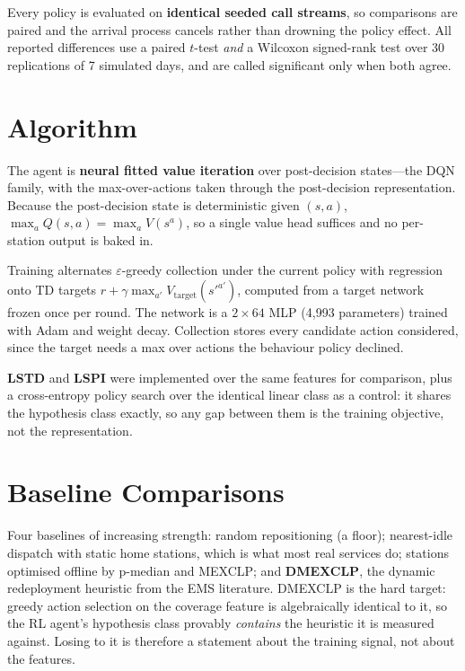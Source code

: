 \documentclass[10pt,twocolumn,a4paper]{article}
\begin{document}
Every policy is evaluated on \textbf{identical seeded call streams}, so comparisons are
paired and the arrival process cancels rather than drowning the policy effect. All
reported differences use a paired $t$-test \emph{and} a Wilcoxon signed-rank test over 30
replications of 7 simulated days, and are called significant only when both agree.

\section{Algorithm}
The agent is \textbf{neural fitted value iteration} over post-decision states---the DQN
family, with the max-over-actions taken through the post-decision representation. Because
the post-decision state is deterministic given $(s,a)$, $\max_a Q(s,a) = \max_a V(s^a)$,
so a single value head suffices and no per-station output is baked in.

Training alternates $\varepsilon$-greedy collection under the current policy with
regression onto TD targets $r + \gamma \max_{a'} V_{\text{target}}(s'^{a'})$, computed from
a target network frozen once per round. The network is a $2\times64$ MLP (4{,}993
parameters) trained with Adam and weight decay. Collection stores every candidate action
considered, since the target needs a max over actions the behaviour policy declined.

\textbf{LSTD} and \textbf{LSPI} were implemented over the same features for comparison,
plus a cross-entropy policy search over the identical linear class as a control: it shares
the hypothesis class exactly, so any gap between them is the training objective, not the
representation.

\section{Baseline Comparisons}
Four baselines of increasing strength: random repositioning (a floor); nearest-idle
dispatch with static home stations, which is what most real services do; stations
optimised offline by p-median and MEXCLP; and \textbf{DMEXCLP}, the dynamic redeployment
heuristic from the EMS literature. DMEXCLP is the hard target: greedy action selection on
the coverage feature is algebraically identical to it, so the RL agent's hypothesis class
provably \emph{contains} the heuristic it is measured against. Losing to it is therefore a
statement about the training signal, not about the features.
\end{document}
